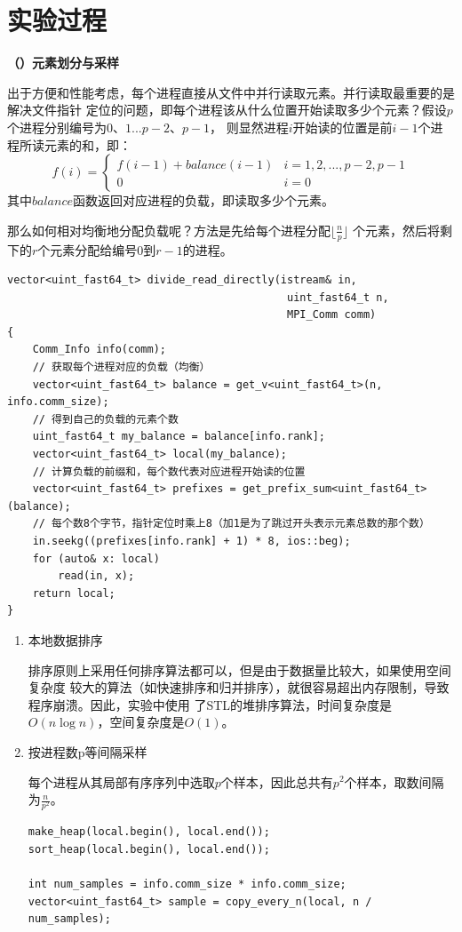 \documentclass[10pt,letterpaper]{ctexart}
\newcommand\zhsubsec[1]{{%
\bfseries{
\stepcounter{subsection}（\zhnum{subsection}）{#1}}
\vspace{0.1pt}%
}}
\begin{document}
\section{实验过程}
\zhsubsec{元素划分与采样}

出于方便和性能考虑，每个进程直接从文件中并行读取元素。并行读取最重要的是解决文件指针
定位的问题，即每个进程该从什么位置开始读取多少个元素？假设$p$个进程分别编号为$0、1...p-2、p-1$，
则显然进程$i$开始读的位置是前$i-1$个进程所读元素的和，即：
\begin{equation}
  f(i) =
    \begin{cases}
      f(i-1) + balance(i-1) & i=1, 2, ..., p-2, p-1\\
      0 & i=0
    \end{cases}
\end{equation}
其中$balance$函数返回对应进程的负载，即读取多少个元素。
\par 那么如何相对均衡地分配负载呢？方法是先给每个进程分配$\lfloor\frac{n}{p}\rfloor$
个元素，然后将剩下的$r$个元素分配给编号$0$到$r-1$的进程。
\begin{lstlisting}[caption=并行读取元素,label={code:read},captionpos=b]
vector<uint_fast64_t> divide_read_directly(istream& in, 
                                            uint_fast64_t n, 
                                            MPI_Comm comm) 
{
    Comm_Info info(comm);
    // 获取每个进程对应的负载（均衡）
    vector<uint_fast64_t> balance = get_v<uint_fast64_t>(n, info.comm_size);
    // 得到自己的负载的元素个数
    uint_fast64_t my_balance = balance[info.rank];
    vector<uint_fast64_t> local(my_balance);
    // 计算负载的前缀和，每个数代表对应进程开始读的位置
    vector<uint_fast64_t> prefixes = get_prefix_sum<uint_fast64_t>(balance);
    // 每个数8个字节，指针定位时乘上8（加1是为了跳过开头表示元素总数的那个数）
    in.seekg((prefixes[info.rank] + 1) * 8, ios::beg);
    for (auto& x: local)
        read(in, x);
    return local;
}
\end{lstlisting}

\begin{enumerate}[itemindent=2.5em,label=\arabic*、]
\item 本地数据排序
\par \qquad 排序原则上采用任何排序算法都可以，但是由于数据量比较大，如果使用空间复杂度
较大的算法（如快速排序和归并排序），就很容易超出内存限制，导致程序崩溃。因此，实验中使用
了STL的堆排序算法，时间复杂度是$O(n \log n)$，空间复杂度是$O(1)$。
\item 按进程数p等间隔采样
\par \qquad 每个进程从其局部有序序列中选取$p$个样本，因此总共有$p^2$个样本，取数间隔为$\frac{n}{p^2}$。
\begin{lstlisting}[caption=排序与采样,label={code:local_sample},captionpos=b]
make_heap(local.begin(), local.end());
sort_heap(local.begin(), local.end());
  
int num_samples = info.comm_size * info.comm_size;
vector<uint_fast64_t> sample = copy_every_n(local, n / num_samples);
\end{lstlisting}

\end{enumerate}
\end{document}
